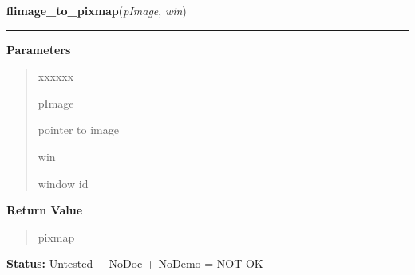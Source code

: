 \hspace{.8\funcindent}\begin{boxedminipage}{\funcwidth}

    \raggedright \textbf{flimage\_to\_pixmap}(\textit{pImage}, \textit{win})

    \vspace{-1.5ex}

    \rule{\textwidth}{0.5\fboxrule}
\setlength{\parskip}{2ex}
\setlength{\parskip}{1ex}
      \textbf{Parameters}
      \vspace{-1ex}

      \begin{quote}
        \begin{Ventry}{xxxxxx}

          \item[pImage]

          pointer to image

          \item[win]

          window id

        \end{Ventry}

      \end{quote}

      \textbf{Return Value}
    \vspace{-1ex}

      \begin{quote}
      pixmap

      \end{quote}

\textbf{Status:} Untested + NoDoc + NoDemo = NOT OK



    \end{boxedminipage}

    \label{xformslib:library:flimage_dup}

    \vspace{0.5ex}

